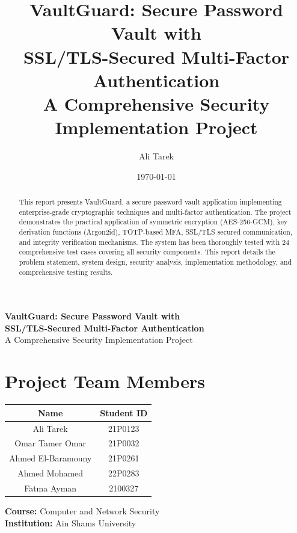 \documentclass[12pt,a4paper]{report}
\title{\textbf{VaultGuard: Secure Password Vault with\\SSL/TLS-Secured Multi-Factor Authentication}\\
\vspace{0.5cm}
\large{A Comprehensive Security Implementation Project}}
\author{Ali Tarek}
\date{\today}
\begin{document}
\begin{titlepage}
\centering
\vspace*{2cm}

\textbf{\LARGE VaultGuard: Secure Password Vault with\\SSL/TLS-Secured Multi-Factor Authentication}\\
\vspace{0.5cm}
{\large A Comprehensive Security Implementation Project}

\vspace{2cm}

\section*{Project Team Members}

\begin{table}[H]
\centering
\begin{tabular}{|c|c|}
\hline
\textbf{Name} & \textbf{Student ID} \\
\hline
Ali Tarek & 21P0123 \\
\hline
Omar Tamer Omar & 21P0032 \\
\hline
Ahmed El-Baramouny & 21P0261 \\
\hline
Ahmed Mohamed & 22P0283 \\
\hline
Fatma Ayman & 2100327 \\
\hline
\end{tabular}
\end{table}

\vspace{2cm}

\textbf{Course:} Computer and Network Security\\
\textbf{Institution:} Ain Shams University\\

\vfill

\end{titlepage}

\newpage

\begin{abstract}
This report presents VaultGuard, a secure password vault application implementing enterprise-grade cryptographic techniques and multi-factor authentication. The project demonstrates the practical application of symmetric encryption (AES-256-GCM), key derivation functions (Argon2id), TOTP-based MFA, SSL/TLS secured communication, and integrity verification mechanisms. The system has been thoroughly tested with 24 comprehensive test cases covering all security components. This report details the problem statement, system design, security analysis, implementation methodology, and comprehensive testing results.
\end{abstract}
\end{document}
